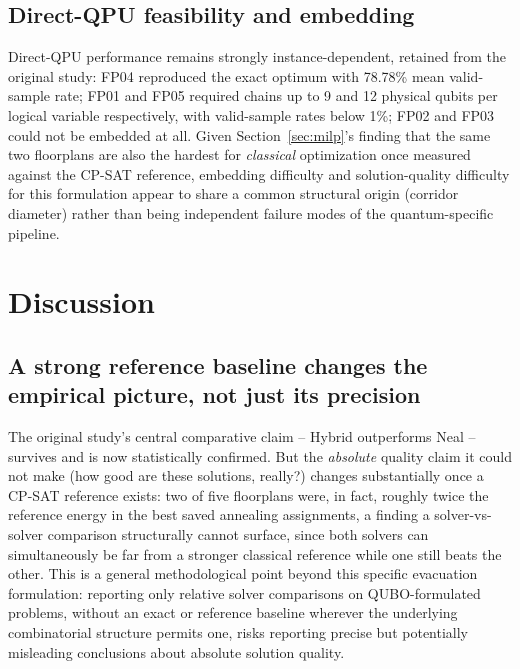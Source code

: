 \documentclass[11pt]{article}
\begin{document}
\subsection{Direct-QPU feasibility and embedding}
Direct-QPU performance remains strongly instance-dependent, retained from the original study: FP04 reproduced the exact optimum with 78.78\% mean valid-sample rate; FP01 and FP05 required chains up to 9 and 12 physical qubits per logical variable respectively, with valid-sample rates below 1\%; FP02 and FP03 could not be embedded at all. Given Section~\ref{sec:milp}'s finding that the same two floorplans are also the hardest for \emph{classical} optimization once measured against the CP-SAT reference, embedding difficulty and solution-quality difficulty for this formulation appear to share a common structural origin (corridor diameter) rather than being independent failure modes of the quantum-specific pipeline.

\section{Discussion}

\subsection{A strong reference baseline changes the empirical picture, not just its precision}
The original study's central comparative claim -- Hybrid outperforms Neal -- survives and is now statistically confirmed. But the \emph{absolute} quality claim it could not make (how good are these solutions, really?) changes substantially once a CP-SAT reference exists: two of five floorplans were, in fact, roughly twice the reference energy in the best saved annealing assignments, a finding a solver-vs-solver comparison structurally cannot surface, since both solvers can simultaneously be far from a stronger classical reference while one still beats the other. This is a general methodological point beyond this specific evacuation formulation: reporting only relative solver comparisons on QUBO-formulated problems, without an exact or reference baseline wherever the underlying combinatorial structure permits one, risks reporting precise but potentially misleading conclusions about absolute solution quality.
\end{document}

